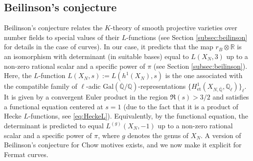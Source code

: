 \documentclass[11pt,a4,leqno]{amsart}
\theoremstyle{my theoremstyle}
\theoremstyle{dfn}
\theoremstyle{remark}
\renewcommand{\1}{\mathbbm{1}}
\newcommand{\Q}{\mathbb{Q}}
\newcommand{\R}{\mathbb{R}}
\numberwithin{equation}{section}
\begin{document}
\subsection{Beilinson's conjecture}


Beilinson's conjecture \cite{Bei80} relates the $K$-theory of smooth projective varieties over number fields to special values of their $L$-functions (see Section \ref{subsec:beilinson} for details in the case of curves). In our case, it predicts that the map $r_B\otimes \R$ is an isomorphism with determinant (in suitable bases) equal to $L(X_N, 3)$ up to a non-zero rational scalar and a specific power of $\pi$ (see Section \ref{subsec:beilinson}).
Here, the $L$-function $L(X_N,s):=L(h^1(X_N), s)$ is the one associated with the compatible family of $\ell$-adic $\mathrm{Gal}(\overline{\Q}/\Q)$-representations $\{ H^1_{\mathrm{et}}(X_{N,\overline{\Q}}, \Q_\ell) \}_\ell$. It is given by a convergent Euler product in the region $\Re(s)> 3/2$ and satisfies a functional equation centered at $s=1$ (due to the fact that it is a product of Hecke $L$-functions, see \eqref{eq:HeckeL}). Equivalently, by the functional equation, the determinant is predicted to equal $L^{(g)}(X_N, -1)$ up to a non-zero rational scalar and a specific power of $\pi$, where $g$ denotes the genus of $X_N$.
A version of Beilinson's conjecture for Chow motives exists, and we now make it explicit for Fermat curves.
\end{document}
